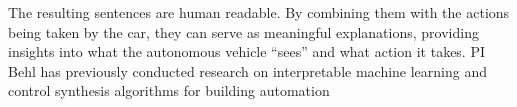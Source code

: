 The resulting sentences are human readable.
By combining them with the actions being taken by the car, they can serve as meaningful explanations, providing insights into what the autonomous vehicle ``sees'' and what action it takes. 
PI Behl has previously conducted research on interpretable machine learning and control synthesis algorithms for building automation~\cite{behl2016interactive,jain2017data}
